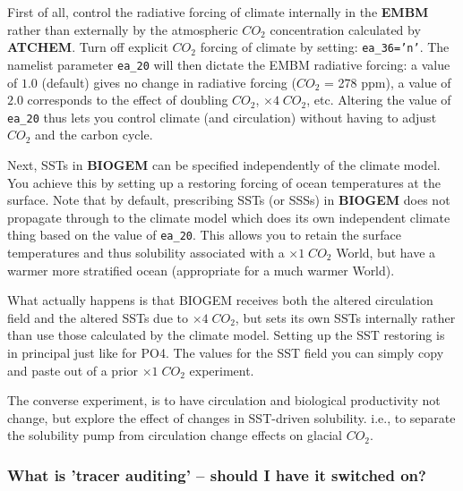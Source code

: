 \documentclass[11pt,fleqn]{book} %
\begin{document}
First of all, control the radiative forcing of climate internally in the \textbf{EMBM} rather than externally by the atmospheric \(CO_{2}\) concentration calculated by \textbf{ATCHEM}. Turn off explicit \(CO_{2}\) forcing of climate by setting: \texttt{ea\_36='n'}. The namelist parameter \texttt{ea\_20} will then dictate the EMBM radiative forcing: a value of \(1.0\) (default) gives no change in radiative forcing (\(CO_{2}\) = 278 ppm), a value of \(2.0\) corresponds to the effect of doubling \(CO_{2}\), \(\times  4\;CO_{2}\), etc. Altering the value of \texttt{ea\_20} thus lets you control climate (and circulation) without having to adjust \(CO_{2}\) and the carbon cycle.

Next, SSTs in \textbf{BIOGEM} can be specified independently of the climate model. You achieve this by setting up a restoring forcing of ocean temperatures at the surface. Note that by default, prescribing SSTs (or SSSs) in \textbf{BIOGEM} does not propagate through to the climate model which does its own independent climate thing based on the value of \texttt{ea\_20}. This allows you to retain the surface temperatures and thus solubility associated with a \(\times  1\;CO_{2}\) World, but have a warmer more stratified ocean (appropriate for a much warmer World).

What actually happens is that BIOGEM receives both the altered circulation field and the altered SSTs due to \(\times  4\;CO_{2}\), but sets its own SSTs internally rather than use those calculated by the climate model. Setting up the SST restoring is in principal just like for PO4. The values for the SST field you can simply copy and paste out of a prior \(\times  1\;CO_{2}\) experiment.

The converse experiment, is to have circulation and biological productivity not change, but explore the effect of changes in SST-driven solubility. i.e., to separate the solubility pump from circulation change effects on glacial \(CO_{2}\).

%
\subsubsection{What is 'tracer auditing' -- should I have it switched on?}
\end{document}
